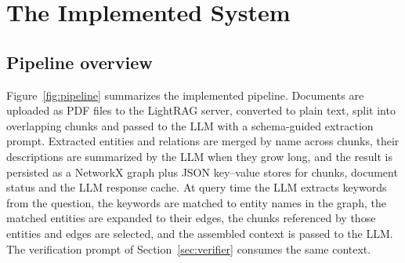 \documentclass[lettersize,journal]{IEEEtran}
\begin{document}
\section{The Implemented System}
\label{sec:system}

\subsection{Pipeline overview}

Figure~\ref{fig:pipeline} summarizes the implemented pipeline. Documents are uploaded as PDF files to the LightRAG server, converted to plain text, split into overlapping chunks and passed to the LLM with a schema-guided extraction prompt. Extracted entities and relations are merged by name across chunks, their descriptions are summarized by the LLM when they grow long, and the result is persisted as a NetworkX graph plus JSON key--value stores for chunks, document status and the LLM response cache. At query time the LLM extracts keywords from the question, the keywords are matched to entity names in the graph, the matched entities are expanded to their edges, the chunks referenced by those entities and edges are selected, and the assembled context is passed to the LLM. The verification prompt of Section~\ref{sec:verifier} consumes the same context.
\end{document}

